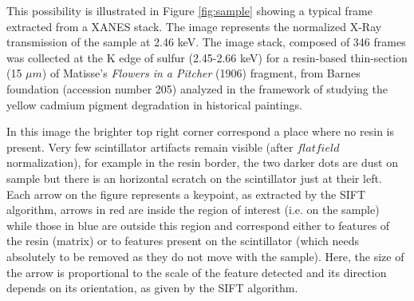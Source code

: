\documentclass[preprint]{iucr}
\begin{document}
This possibility is illustrated in Figure \ref{fig:sample} showing a typical
frame extracted from a XANES stack. 
The image represents the normalized X-Ray transmission of the sample at 2.46
keV. 
The image stack, composed of 346 frames was collected at the K edge of sulfur
(2.45-2.66 keV) for a resin-based thin-section
(15 $\mu m$) of Matisse’s \emph{Flowers in a Pitcher} (1906) fragment, from
Barnes foundation (accession number 205) analyzed in the framework of studying the
yellow cadmium pigment degradation in historical paintings.

In this image the brighter top right corner correspond a place where no resin is
present. Very few scintillator artifacts remain visible (after $flat field$
normalization), for example in the resin border, the two darker dots are dust on
sample but there is an horizontal scratch on the scintillator just at their
left.
Each arrow on the figure represents a keypoint, as extracted by the SIFT
algorithm, arrows in red are inside the region of interest (i.e. on the sample)
while those in blue are outside this region and
correspond either to features of the resin (matrix) or to features present on
the scintillator (which needs absolutely to be removed as they do not move
with the sample).
Here, the size of the arrow is proportional to the scale of the feature
detected and its direction depends on its orientation, as given by the SIFT algorithm.
\end{document}
